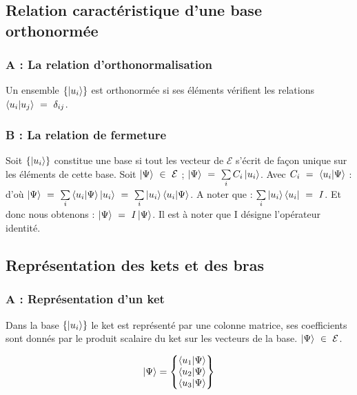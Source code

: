 \documentclass[12pt,a4paper,titlepage]{book}
\begin{document}
\subsection{Relation caractéristique d'une base orthonormée}
\subsubsection{A : La relation d'orthonormalisation}

Un ensemble $\lbrace \ket{u_i} \rbrace$ est orthonormée si ses éléments vérifient les relations $\braket{u_i | u_j} ~=~ \delta_{ij}$.

\subsubsection{B : La relation de fermeture}

Soit $\lbrace \ket{u_i} \rbrace$ constitue une base si tout les vecteur de $\mathcal{E}$ s'écrit de façon unique sur les éléments de cette base. Soit $\ket{\Psi}~\in~ \mathcal{E}$ ; $\ket{\Psi} ~=~ \sum\limits_i C_i \ket{u_i}$. Avec $C_i ~=~ \braket{u_i | \Psi}$ : d'où $\ket{\Psi} ~=~ \sum\limits_i \braket{u_i | \Psi} \ket{u_i} ~=~ \sum\limits_i \ket{u_i} \braket{u_i | \Psi}$. A noter que : $\sum\limits_i \ket{u_i} \bra{u_i} ~=~ I$. Et donc nous obtenons : $\ket{\Psi} ~=~ I \ket{\Psi}$. Il est à noter que I désigne l'opérateur identité.

\subsection{Représentation des kets et des bras}
\subsubsection{A : Représentation d'un ket}

Dans la base $\lbrace \ket{u_i} \rbrace$ le ket est représenté par une colonne matrice, ses coefficients sont donnés par le produit scalaire du ket sur les vecteurs de la base. $\ket{\Psi} ~\in~ \mathcal{E}$.\\

\begin{center}
\[
\ket{\Psi}=
\left\lbrace
\begin{matrix}
\braket{u_1 | \Psi}\\
\braket{u_2 | \Psi}\\
\braket{u_3 | \Psi}
\end{matrix}
\right\rbrace
\]
\end{center}
\end{document}
